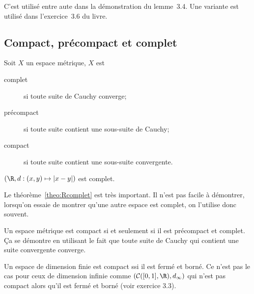 C'est utilisé entre aute dans la démonstration du lemme~3.4.
Une variante est utilisé dans l'exercice~3.6 du livre.

\subsection{Compact, précompact et complet}
\begin{mydef}[2.5]
  Soit $X$ un espace métrique, $X$ est
  \begin{description}
    \item[complet] si toute suite de Cauchy converge;
    \item[précompact] si toute suite contient une sous-suite
      de Cauchy;
    \item[compact] si toute suite contient une sous-suite
      convergente.
  \end{description}
\end{mydef}

\begin{mytheo}[2.8]
  \label{theo:Rcomplet}
  $(\R,d:(x,y)\mapsto|x-y|)$ est complet.
\end{mytheo}
Le théorème~\ref{theo:Rcomplet} est très important.
Il n'est pas facile à démontrer,
lorsqu'on essaie de montrer qu'une autre espace est complet,
on l'utilise donc souvent.

\begin{myprop}[2.6, 2.7]
  Un espace métrique est compact si et seulement si
  il est précompact et complet.
  Ça se démontre en utilisant le fait que toute suite
  de Cauchy qui contient une suite convergente converge.
\end{myprop}

\begin{myrem}
  Un espace de dimension finie est compact ssi il est fermé et borné.
  Ce n'est pas le cas pour ceux de dimension infinie comme
  $(\mathcal{C}([0,1],\R), d_\infty)$ qui n'est pas compact
  alors qu'il est fermé et borné (voir exercice 3.3).
\end{myrem}

